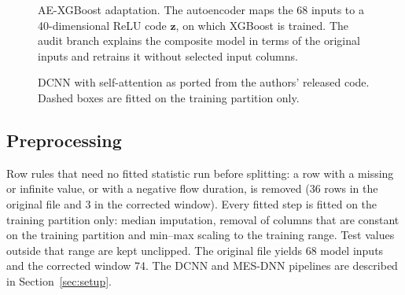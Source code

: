 \documentclass[journal]{IEEEtran}
\begin{document}
\begin{figure}[!t]
\centering
\resizebox{\columnwidth}{!}{}
\caption{AE-XGBoost adaptation. The autoencoder maps the 68 inputs to a 40-dimensional ReLU code
$\mathbf{z}$, on which XGBoost is trained. The audit branch explains the composite model in terms
of the original inputs and retrains it without selected input columns.}
\label{fig:aexgb}
\end{figure}

\begin{figure}[!t]
\centering

\caption{DCNN with self-attention as ported from the authors' released code. Dashed boxes are
fitted on the training partition only.}
\label{fig:dcnn}
\end{figure}

\subsection{Preprocessing}
Row rules that need no fitted statistic run before splitting: a row with a missing or infinite
value, or with a negative flow duration, is removed (36 rows in the original file and 3 in the
corrected window). %
Every fitted step is fitted on the training partition only: median imputation, removal of columns
that are constant on the training partition and min--max scaling to the training range. Test
values outside that range are kept unclipped. The original file yields 68 model inputs and the
corrected window 74. %
The DCNN and MES-DNN pipelines are described in Section~\ref{sec:setup}.
\end{document}
